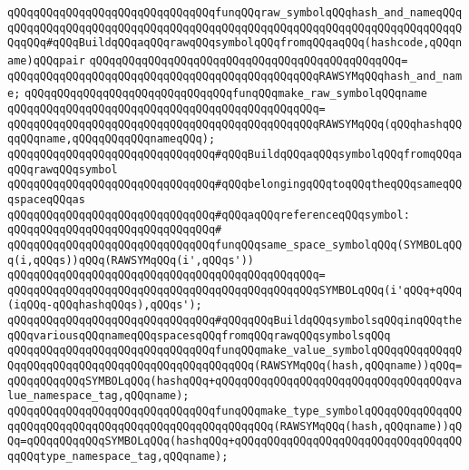 \newline
\newline
\verb|qQQqqQQqqQQqqQQqqQQqqQQqqQQqqQQqfunqQQqraw_symbolqQQqhash_and_nameqQQqqQQqqQQqqQQqqQQqqQQqqQQqqQQqqQQqqQQqqQQqqQQqqQQqqQQqqQQqqQQqqQQqqQQqqQQqqQQq#qQQqBuildqQQqaqQQqrawqQQqsymbolqQQqfromqQQqaqQQq(hashcode,qQQqname)qQQqpair|\newline
\verb|qQQqqQQqqQQqqQQqqQQqqQQqqQQqqQQqqQQqqQQqqQQqqQQq=|\newline
\verb|qQQqqQQqqQQqqQQqqQQqqQQqqQQqqQQqqQQqqQQqqQQqqQQqRAWSYMqQQqhash_and_name;|\newline
\newline
\verb|qQQqqQQqqQQqqQQqqQQqqQQqqQQqqQQqfunqQQqmake_raw_symbolqQQqname|\newline
\verb|qQQqqQQqqQQqqQQqqQQqqQQqqQQqqQQqqQQqqQQqqQQqqQQq=|\newline
\verb|qQQqqQQqqQQqqQQqqQQqqQQqqQQqqQQqqQQqqQQqqQQqqQQqRAWSYMqQQq(qQQqhashqQQqqQQqname,qQQqqQQqqQQqnameqQQq);|\newline
\newline
\verb|qQQqqQQqqQQqqQQqqQQqqQQqqQQqqQQq#qQQqBuildqQQqaqQQqsymbolqQQqfromqQQqaqQQqrawqQQqsymbol|\newline
\verb|qQQqqQQqqQQqqQQqqQQqqQQqqQQqqQQq#qQQqbelongingqQQqtoqQQqtheqQQqsameqQQqspaceqQQqas|\newline
\verb|qQQqqQQqqQQqqQQqqQQqqQQqqQQqqQQq#qQQqaqQQqreferenceqQQqsymbol:|\newline
\verb|qQQqqQQqqQQqqQQqqQQqqQQqqQQqqQQq#|\newline
\verb|qQQqqQQqqQQqqQQqqQQqqQQqqQQqqQQqfunqQQqsame_space_symbolqQQq(SYMBOLqQQq(i,qQQqs))qQQq(RAWSYMqQQq(i',qQQqs'))|\newline
\verb|qQQqqQQqqQQqqQQqqQQqqQQqqQQqqQQqqQQqqQQqqQQqqQQq=|\newline
\verb|qQQqqQQqqQQqqQQqqQQqqQQqqQQqqQQqqQQqqQQqqQQqqQQqSYMBOLqQQq(i'qQQq+qQQq(iqQQq-qQQqhashqQQqs),qQQqs');|\newline
\newline
\verb|qQQqqQQqqQQqqQQqqQQqqQQqqQQqqQQq#qQQqqQQqBuildqQQqsymbolsqQQqinqQQqtheqQQqvariousqQQqnameqQQqspacesqQQqfromqQQqrawqQQqsymbolsqQQq|\newline
\newline
\verb|qQQqqQQqqQQqqQQqqQQqqQQqqQQqqQQqfunqQQqmake_value_symbolqQQqqQQqqQQqqQQqqQQqqQQqqQQqqQQqqQQqqQQqqQQqqQQqqQQq(RAWSYMqQQq(hash,qQQqname))qQQq=qQQqqQQqqQQqSYMBOLqQQq(hashqQQq+qQQqqQQqqQQqqQQqqQQqqQQqqQQqqQQqqQQqvalue_namespace_tag,qQQqname);|\newline
\verb|qQQqqQQqqQQqqQQqqQQqqQQqqQQqqQQqfunqQQqmake_type_symbolqQQqqQQqqQQqqQQqqQQqqQQqqQQqqQQqqQQqqQQqqQQqqQQqqQQqqQQq(RAWSYMqQQq(hash,qQQqname))qQQq=qQQqqQQqqQQqSYMBOLqQQq(hashqQQq+qQQqqQQqqQQqqQQqqQQqqQQqqQQqqQQqqQQqqQQqtype_namespace_tag,qQQqname);|\newline
